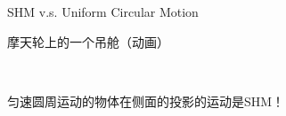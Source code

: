 \documentclass{beamer}
\begin{document}
\begin{frame}{SHM v.s. Uniform Circular Motion}
	\begin{block}{摩天轮上的一个吊舱（动画）}
		\begin{center}
		\href{run:./LectureNotePics/CircSHM.gif}{}\\
		\end{center}
	\end{block}
	
	\begin{center}
	\begin{Large}
		匀速圆周运动的物体在侧面的投影的运动是SHM！
	\end{Large}
	\end{center}
\end{frame}
\end{document}
